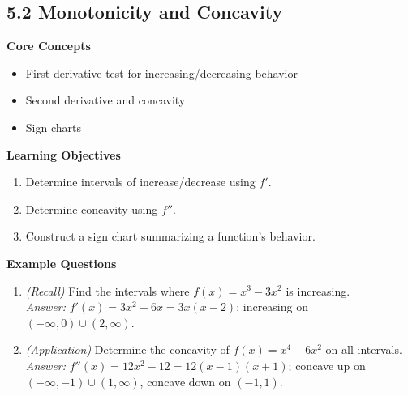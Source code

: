 \documentclass[11pt]{article}
\begin{document}
\subsection{5.2 Monotonicity and Concavity}
\textbf{Core Concepts}
\begin{itemize}
\item First derivative test for increasing/decreasing behavior
\item Second derivative and concavity
\item Sign charts
\end{itemize}
\textbf{Learning Objectives}
\begin{enumerate}
\item Determine intervals of increase/decrease using $f'$.
\item Determine concavity using $f''$.
\item Construct a sign chart summarizing a function's behavior.
\end{enumerate}
\textbf{Example Questions}
\begin{enumerate}
\item \emph{(Recall)} Find the intervals where $f(x)=x^3-3x^2$ is increasing. \\
\textit{Answer:} $f'(x)=3x^2-6x = 3x(x-2)$; increasing on $(-\infty,0)\cup(2,\infty)$.
\item \emph{(Application)} Determine the concavity of $f(x)=x^4-6x^2$ on all intervals. \\
\textit{Answer:} $f''(x)=12x^2-12=12(x-1)(x+1)$; concave up on $(-\infty,-1)\cup(1,\infty)$, concave down on $(-1,1)$.
\end{enumerate}
\end{document}
